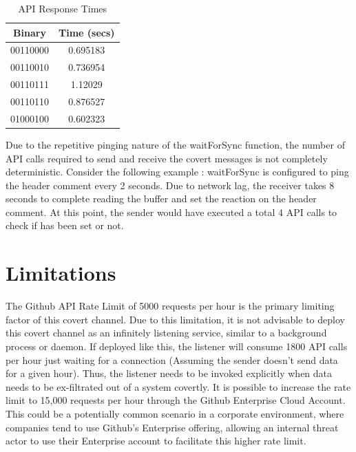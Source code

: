 \documentclass[conference]{IEEEtran}
\begin{document}
\begin{table}[htbp]
\caption{API Response Times}
\begin{center}
\begin{tabular}{|c|c|}
\hline
\textbf{Binary} & \textbf{Time (secs)} \\
\hline
{00110000} & {0.695183} \\
\hline
{00110010} & {0.736954} \\
\hline
{00110111} & {1.12029} \\
\hline
{00110110} & {0.876527} \\
\hline
{01000100} & {0.602323} \\
\hline
\end{tabular}
\label{api_call_table}
\end{center}
\end{table}

Due to the repetitive pinging nature of the waitForSync function, the number of API calls required to send and receive the covert messages is not completely deterministic. Consider the following example : waitForSync is configured to ping the header comment every 2 seconds. Due to network lag, the receiver takes 8 seconds to complete reading the buffer and set the  reaction on the header comment. At this point, the sender would have executed a total 4 API calls to check if  has been set or not. 

\section{Limitations}

The Github API Rate Limit of 5000 requests per hour is the primary limiting factor of this covert channel. Due to this limitation, it is not advisable to deploy this covert channel as an infinitely listening service, similar to a background process or daemon. If deployed like this, the listener will consume 1800 API calls per hour just waiting for a connection (Assuming the sender doesn't send data for a given hour). Thus, the listener needs to be invoked explicitly when data needs to be ex-filtrated out of a system covertly. It is possible to increase the rate limit to 15,000 requests per hour through the Github Enterprise Cloud Account. This could be a potentially common scenario in a corporate environment, where companies tend to use Github's Enterprise offering, allowing an internal threat actor to use their Enterprise account to facilitate this higher rate limit. 
\end{document}
